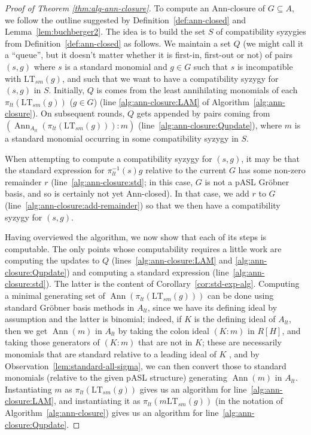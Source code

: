 \documentclass[11pt,reqno]{amsart}
\newcommand{\suchthat}{:}
\DeclareMathOperator{\Ann}{Ann}
\newcommand{\ltsm}{\text{LT}_{sm}}
\theoremstyle{definition}
\numberwithin{equation}{section}
\begin{document}
\begin{proof}[Proof of Theorem \ref{thm:alg-ann-closure}]
To compute an Ann-closure of $G \subseteq A$, we follow the outline suggested by Definition~\ref{def:ann-closed} and Lemma~\ref{lem:buchberger2}. The idea is to build the set $S$ of compatibility syzygies from Definition~\ref{def:ann-closed} as follows. We maintain a set $Q$ (we might call it a ``queue'', but it doesn't matter whether it is first-in, first-out or not) of pairs $(s,g)$ where $s$ is a standard monomial and $g \in G$ such that $s$ is incompatible with $\ltsm(g)$, and such that we want to have a compatibility syzygy for $(s,g)$ in $S$. Initially, $Q$ is comes from the least annihilating monomials of each $\pi_{lt}(\ltsm(g))$ ($g \in G$) (line \ref{alg:ann-closure:LAM} of Algorithm~\ref{alg:ann-closure}). On subsequent rounds, $Q$ gets appended by pairs coming from $(\Ann_{A_{lt}}(\pi_{lt}(\ltsm(g))) \suchthat m)$ (line~\ref{alg:ann-closure:Qupdate}), where $m$ is a standard monomial occurring in some compatibility syzygy in $S$. 

When attempting to compute a compatibility syzygy for $(s,g)$, it may be that the standard expression for $\pi_{lt}^{-1}(s)g$ relative to the current $G$ has some non-zero remainder $r$ (line~\ref{alg:ann-closure:std}; in this case, $G$ is not a pASL Gröbner basis, and so is certainly not yet Ann-closed). In that case, we add $r$ to $G$ (line~\ref{alg:ann-closure:add-remainder}) so that we then have a compatibility syzygy for $(s,g)$.

Having overviewed the algorithm, we now show that each of its steps is computable.
The only points whose computability requires a little work are computing the updates to $Q$ (lines~\ref{alg:ann-closure:LAM} and \ref{alg:ann-closure:Qupdate}) and computing a standard expression (line~\ref{alg:ann-closure:std}). The latter is the content of Corollary~\ref{cor:std-exp-alg}. Computing a minimal generating set of $\Ann(\pi_{lt}(\ltsm(g)))$ can be done using standard Gröbner basis methods in $A_{lt}$, since we have its defining ideal by assumption and the latter is binomial; indeed, if $K$ is the defining ideal of $A_{lt}$, then we get $\Ann(m)$ in $A_{lt}$ by taking the colon ideal $(K : m)$ in $R[H]$, and taking those generators of $(K : m)$ that are not in $K$; these are necessarily monomials that are standard relative to a leading ideal of $K$ \cite{ES}, and by Observation~\ref{lem:standard-all-sigma}, we can then convert those to standard monomials (relative to the given pASL structure) generating $\Ann(m)$ in $A_{lt}$. Instantiating $m$ as $\pi_{lt}(\ltsm(g))$ gives us an algorithm for line~\ref{alg:ann-closure:LAM}, and instantiating it as $\pi_{lt}(m\ltsm(g))$ (in the notation of Algorithm~\ref{alg:ann-closure}) gives us an algorithm for line~\ref{alg:ann-closure:Qupdate}.


\end{proof}
\end{document}
